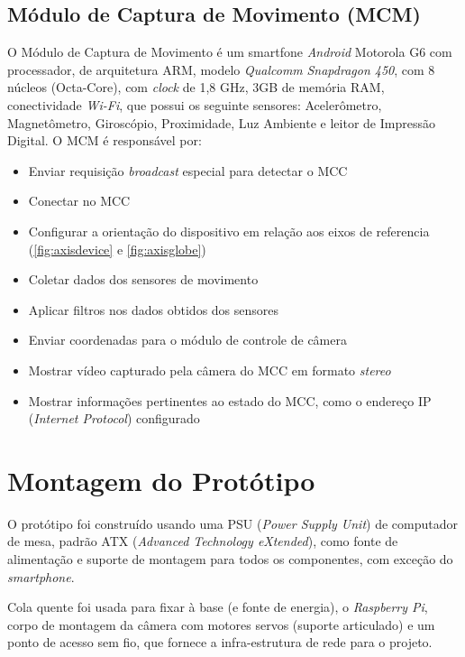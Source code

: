 \subsection{Módulo de Captura de Movimento (MCM)}
\label{subsec:modcapmov}

O Módulo de Captura de Movimento é um smartfone \textit{Android} Motorola G6 com processador, de arquitetura ARM, modelo \textit{Qualcomm} \textit{Snapdragon 450}, com 8 núcleos (Octa-Core), com \textit{clock} de 1,8 GHz, 3GB de memória RAM, conectividade \textit{Wi-Fi}, que possui os seguinte sensores: Acelerômetro, Magnetômetro, Giroscópio, Proximidade, Luz Ambiente e leitor de Impressão Digital. O MCM é responsável por:

\begin{itemize}
	\item Enviar requisição \textit{broadcast} especial para detectar o MCC
	\item Conectar no MCC
	\item Configurar a orientação do dispositivo em relação aos eixos de referencia (\autoref{fig:axisdevice} e \autoref{fig:axisglobe})
	\item Coletar dados dos sensores de movimento
	\item Aplicar filtros nos dados obtidos dos sensores
	\item Enviar coordenadas para o módulo de controle de câmera
	\item Mostrar vídeo capturado pela câmera do MCC em formato \textit{stereo}
	\item Mostrar informações pertinentes ao estado do MCC, como o endereço IP (\textit{Internet Protocol}) configurado
\end{itemize}

\section{Montagem do Protótipo}
\label{sec:assemprototipo}

O protótipo foi construído usando uma PSU (\textit{Power Supply Unit}) de computador de mesa, padrão ATX (\textit{Advanced Technology eXtended}), como fonte de alimentação e suporte de montagem para todos os componentes, com exceção do \textit{smartphone}.\par

Cola quente foi usada para fixar à base (e fonte de energia), o \textit{Raspberry Pi}, corpo de montagem da câmera com motores servos (suporte articulado) e um ponto de acesso sem fio, que fornece a infra-estrutura de rede para o projeto. \par

